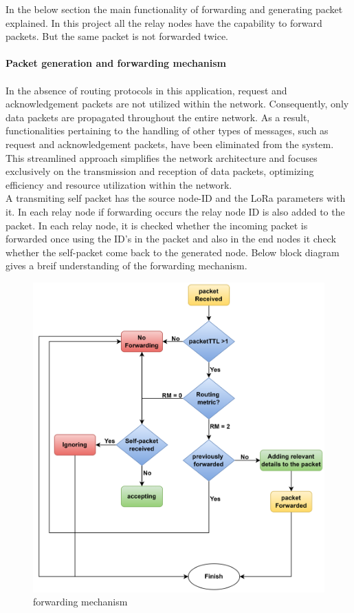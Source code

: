 In the below section the main functionality of forwarding and generating packet explained. In this project all the relay nodes have the capability to forward packets. But the same packet is not forwarded twice.\\\\
\textbf{Packet generation and forwarding mechanism}\\\\
In the absence of routing protocols in this application, request and acknowledgement packets are not utilized within the network. Consequently, only data packets are propagated throughout the entire network. As a result, functionalities pertaining to the handling of other types of messages, such as request and acknowledgement packets, have been eliminated from the system. This streamlined approach simplifies the network architecture and focuses exclusively on the transmission and reception of data packets, optimizing efficiency and resource utilization within the network.\\
A transmiting self packet has the source node-ID and the LoRa parameters with it. In each relay node if forwarding occurs the relay node ID is also added to the packet. In each relay node, it is checked whether the incoming packet is forwarded once using the ID's in the packet and also in the end nodes it check whether the self-packet come back to the generated node. Below block diagram gives a breif understanding of the forwarding mechanism.\\
\newpage
            \begin{figure}[h!]
                \centering
                \includegraphics[width=0.9\columnwidth]{images/forwarding mechanism.jpg}
                \caption{forwarding mechanism}
                \label{fig:forwarding mechanism}
            \end{figure}
